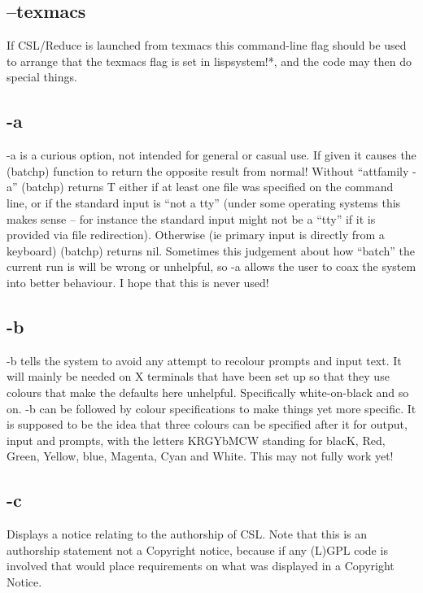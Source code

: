 \documentclass[a4paper,11pt]{article}
\begin{document}
\subsection{\ttfamily --texmacs}
If CSL/Reduce is launched from texmacs this command-line flag should be
used to arrange that the {\ttfamily texmacs} flag is set in
{\ttfamily lispsystem!*}, and the code may then do special things.

\subsection{\ttfamily -a}
{\ttfamily -a} is a curious option, not intended for general or casual use.
If given it causes the {\ttfamily (batchp)} function to return the opposite
result from normal!  Without ``{attfamily -a}'' {\ttfamily (batchp)} returns
{\ttfamily T} either if at least one file was specified on the command line,
or if the standard input is ``not a tty'' (under some operating systems this
makes sense -- for instance the standard input might not be a ``tty'' if it
is provided via file redirection).  Otherwise (ie primary input is directly
from a keyboard) {\ttfamily (batchp)} returns {\ttfamily nil}.  Sometimes
this judgement about how ``batch'' the current run is will be wrong or
unhelpful, so {\ttfamily -a} allows the user to coax the system into better
behaviour.  I hope that this is never used!

\subsection{\ttfamily -b}
{\ttfamily -b} tells the system to avoid any attempt to recolour prompts
and input text. It will mainly be needed on X terminals that have been
set up so that they use colours that make the defaults here unhelpful.
Specifically white-on-black and so on.
{\ttfamily -b} can be followed by colour specifications to make things yet
more specific. It is supposed to be the idea that three colours can be
specified after it for output, input and prompts, with the letters KRGYbMCW
standing for blacK, Red, Green, Yellow, blue, Magenta, Cyan and White.
This may not fully work yet!

\subsection{\ttfamily -c}
Displays a notice relating to the authorship of CSL. Note that this
is an authorship statement not a Copyright notice, because if any
(L)GPL code is involved that would place requirements on what was
displayed in a Copyright Notice.
\end{document}
